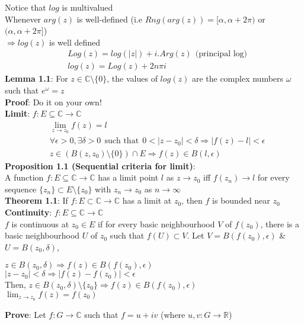 \documentclass{article}
\begin{document}
\begin{flushleft}
Notice that $log$ is multivalued\\
Whenever $arg(z)$ is well-defined (i.e $Rng(arg(z))=[\alpha,\alpha+2\pi)$ or $(\alpha,\alpha+2\pi]$)\\$\Rightarrow log(z)$ is well defined
\begin{align}
&Log(z)=log(|z|)+i.Arg(z) \:\:\text{(principal log)} \nonumber\\
&log(z)=Log(z)+2n\pi i \nonumber
\end{align}
\textbf{Lemma 1.1}: For $z\in \mathds{C}\setminus \{0\}$, the values of $log(z)$ are the complex numbers $\omega$ such that $e^{\omega}=z$\\
\textbf{Proof}: Do it on your own!\\
\vspace{3mm}
\textbf{Limit}: $f: E\subseteq \mathds{C} \rightarrow \mathds{C}$
\begin{align}
&\lim_{z \to z_0} f(z)=l \nonumber\\
&\forall \epsilon>0,\exists \delta>0 \:\:\text{such that}\:\: 0<|z-z_0|<\delta \Rightarrow |f(z)-l|<\epsilon\nonumber\\
&z \in (B(z,z_0)\setminus\{0\})\cap E \Rightarrow f(z)\in B(l,\epsilon) \nonumber
\end{align}
\textbf{Proposition 1.1 (Sequential criteria for limit)}: \\ A function $f:E\subseteq  \mathds{C}\rightarrow \mathds{C}$ has a limit point $l$ as $z\rightarrow z_0$ iff $f(z_n)\rightarrow l$ for every sequence $\{z_n\}\subset E\setminus \{z_0\}$ with $z_n\rightarrow z_0$ as $n\rightarrow \infty$\\
\vspace{2mm}
\textbf{Theorem 1.1}: If $f:E\subset \mathds{C} \rightarrow \mathds{C}$ has a limit at $z_0$, then $f$ is bounded near $z_0$\\
\vspace{2mm}
\textbf{Continuity}: $f:E\subseteq \mathds{C}\rightarrow \mathds{C}$\\
$f$ is continuous at $z_0\in E$ if for every basic neighbourhood $V$ of $f(z_0)$, there is a basic neighbourhood $U$ of $z_0$ such that $f(U)\subset V$. Let $V=B(f(z_0),\epsilon)$ \& $U=B(z_0,\delta)$,
\begin{center}
$z\in B(z_0,\delta)\Rightarrow f(z)\in B(f(z_0),\epsilon)$\\
$|z-z_0|<\delta \Rightarrow |f(z)-f(z_0)|<\epsilon$\\
Then, $z\in B(z_0,\delta)\setminus \{z_0\} \Rightarrow f(z)\in B(f(z_0),\epsilon)$\\
$\lim_{z \to z_0} f(z)=f(z_0)$
\end{center}
\textbf{Prove}: Let $f:G\rightarrow \mathds{C}$ such that $f=u+ iv$ (where $u,v:G\rightarrow \mathds{R}$)


\end{flushleft}
\end{document}
